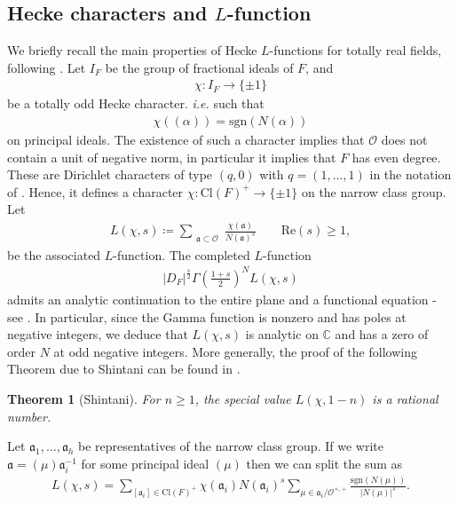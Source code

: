 \documentclass[twoside,a4paper,10pt]{article} %
\newcommand{\8}{\infty}
\newcommand{\C}{\mathbb{C}}
\newcommand{\afrak}{\mathfrak{a}}
\newcommand{\sgn}{\mathrm{sgn}}
\newcommand{\Ocal}{\mathcal{O}}
\newcommand{\Cl}{\textrm{Cl}}
\newcommand{\re}{\mathrm{Re}}
\theoremstyle{mytheoremstyle}
\newtheorem{thm}{Theorem}[section]
\theoremstyle{remark}
\numberwithin{equation}{section}
\begin{document}
\subsection{Hecke characters and $L$-function} We briefly recall the main properties of Hecke $L$-functions for totally real fields, following \cite{neukirch}.
Let $I_F$ be the group of fractional ideals of $F$, and 
\begin{align}
\chi \colon I_F \longrightarrow \{ \pm 1\}
\end{align} be a totally odd Hecke character. {\em i.e.} such that
\begin{align}
\chi((\alpha))=\sgn(N(\alpha))
\end{align}
on principal ideals. The existence of such a character implies that $\Ocal$ does not contain a unit of negative norm, in particular it implies that $F$ has even degree. These are Dirichlet characters of type $(q,0)$ with $q=(1,\dots,1)$ in the notation of \cite[Definition.~6.8 on p.~478]{neukirch}.
Hence, it defines a character $\chi \colon \Cl(F)^+ \longrightarrow \{ \pm 1\}$ on the narrow class group. Let
\begin{align}
 L(\chi,s) \coloneqq \sum_{\substack{\afrak \subset \Ocal}} \frac{\chi(\afrak)}{N(\afrak)^s} \qquad \re(s) \geq 1,
\end{align}
be the associated $L$-function. The completed $L$-function
\begin{align}
\vert D_F \vert^\frac{s}{2}  \Gamma\left (\frac{1+s}{2} \right )^N L(\chi,s)
\end{align}
admits an analytic continuation to the entire plane and a functional equation - see \cite[Theorem.~8.5 on p.~502]{neukirch}.  In particular,  since the Gamma function is nonzero and has poles at negative integers, we deduce that $L(\chi,s)$ is analytic on $\C$ and has a zero of order $N$ at odd negative integers. More generally, the proof of the following Theorem due to Shintani can be found in \cite[Theorem.~9.8 on p.~515]{neukirch}.
\begin{thm}[Shintani] \label{Shintani}  For $n \geq 1$, the special value $L(\chi,1-n)$ is a rational number.
\end{thm}



Let $\afrak_1, \dots, \afrak_h$ be representatives of the narrow class group. If we write $\afrak=(\mu) \afrak_i^{-1}$ for some principal ideal $(\mu)$ then we can split the sum as
\begin{align}
 L(\chi,s)=\sum_{[\afrak_i]\in \Cl(F)^+} \chi(\afrak_i) N(\afrak_i)^s\sum_{\mu \in \afrak_i /\Ocal^{\times,+}} \frac{\sgn(N(\mu))}{\vert N(\mu)\vert^s}.
\end{align}
\end{document}
